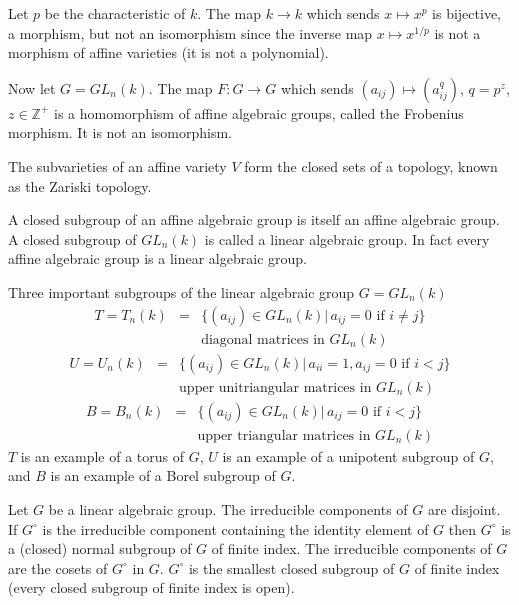 \begin{example}
	Let $p$ be the characteristic of $k$. The map $k\rightarrow k$ which sends $x\mapsto x^p$ is bijective, a morphism, but not an isomorphism since the inverse map $x\mapsto x^{1/p}$ is not a morphism of affine varieties (it is not a polynomial).
	
	Now let $G = GL_n(k)$. The map $F:G\rightarrow G$ which sends $(a_{ij})\mapsto (a_{ij}^q)$, $q = p^z$, $z \in \mathbb{Z}^+$ is a homomorphism of affine algebraic groups, called the Frobenius morphism. It is not an isomorphism.
\end{example}

The subvarieties of an affine variety $V$ form the closed sets of a topology, known as the Zariski topology.

A closed subgroup of an affine algebraic group is itself an affine algebraic group. A closed subgroup of $GL_n(k)$ is called a linear algebraic group. In fact every affine algebraic group is a linear algebraic group.

\begin{example}
	Three important subgroups of the linear algebraic group $G = GL_n(k)$
	\begin{eqnarray*}
		T = T_n(k) &=& \{ (a_{ij}) \in GL_n(k) |\, a_{ij} = 0 \textrm{ if } i \neq j\}\\
		&& \textrm{diagonal matrices in } GL_n(k)
	\end{eqnarray*}
	\begin{eqnarray*}
		U = U_n(k) &=& \{ (a_{ij}) \in GL_n(k) |\, a_{ii} = 1, a_{ij} = 0 \textrm{ if } i < j\}\\
		&& \textrm{upper unitriangular matrices in } GL_n(k)
	\end{eqnarray*}
	\begin{eqnarray*}
		B = B_n(k) &=& \{ (a_{ij}) \in GL_n(k) |\, a_{ij} = 0 \textrm{ if } i < j\}\\
		&& \textrm{upper triangular matrices in } GL_n(k)
	\end{eqnarray*}
	$T$ is an example of a torus of $G$, $U$ is an example of a unipotent subgroup of $G$, and $B$ is an example of a Borel subgroup of $G$.
\end{example}

Let $G$ be a linear algebraic group. The irreducible components of $G$ are disjoint. If $G^\circ$ is the irreducible component containing the identity element of $G$ then $G^\circ$ is a (closed) normal subgroup of $G$ of finite index. The irreducible components of $G$ are the cosets of $G^\circ$ in $G$. $G^\circ$ is the smallest closed subgroup of $G$ of finite index (every closed subgroup of finite index is open).

